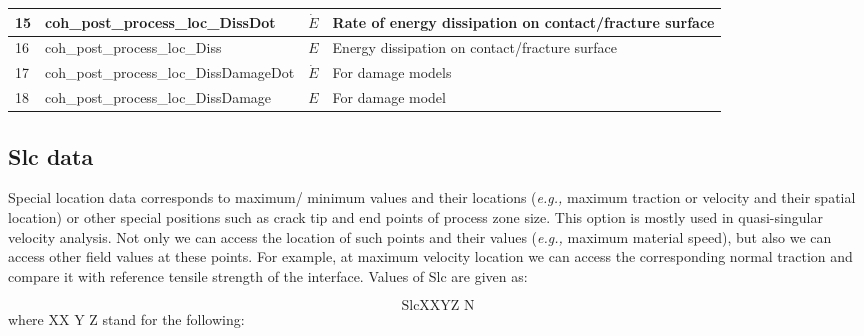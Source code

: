 \documentclass[10pt]{article}
\def\eg{\textit{e.g.,}\xspace}
\begin{document}
\begin{table}[t]
\begin{center}
\begin{tabular}{ | p{2.0cm} | p{6.0cm} | p{2.5cm} | p{6.0cm} | }
\hline 
15 & coh\_post\_process\_loc\_DissDot	& $\dot{E}$	& Rate of energy dissipation on contact/fracture surface \\
\hline 
16 & coh\_post\_process\_loc\_Diss & $E$	& Energy dissipation on contact/fracture surface \\
\hline 
17 & coh\_post\_process\_loc\_DissDamageDot & $\dot{E}$ &  For damage models\\
\hline 
18 & coh\_post\_process\_loc\_DissDamage & $E$ & For damage model\\
\hline 
\end{tabular}
\end{center}
\end{table}

\subsection{Slc data}\label{sec:Slc}
Special location data corresponds to maximum/ minimum values and their locations (\eg maximum traction or velocity and their spatial location) or other special positions such as crack tip and end points of process zone size. This option is mostly used in quasi-singular velocity analysis. Not only we can access the location of such points and their values (\eg maximum material speed), but also we can access other field values at these points. For example, at maximum velocity location we can access the corresponding normal traction and compare it with reference tensile strength of the interface. Values of Slc are given as:

\begin{equation}
\text{SlcXXYZ	N}
\end{equation}
where	XX Y Z stand for the following:
\end{document}
